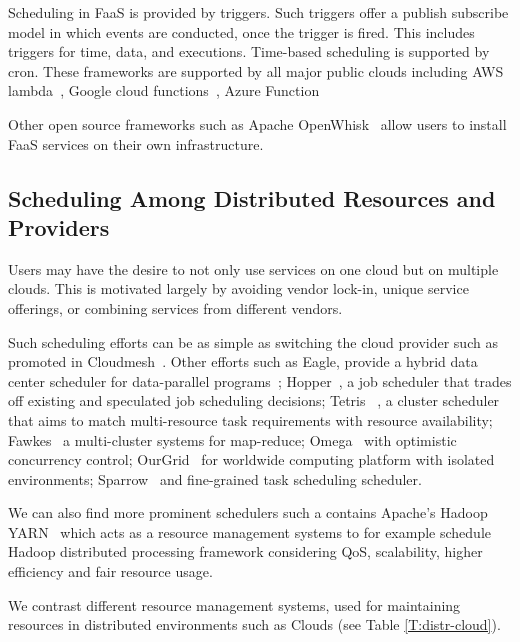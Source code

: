 \documentclass[final,5p,times,twocolumn]{elsarticle}
\begin{document}
Scheduling in FaaS is provided by triggers. Such triggers offer a
publish subscribe model in which events are conducted, once the
trigger is fired. This includes triggers for time, data, and
executions. Time-based scheduling is supported by cron.  These
frameworks are supported by all major public clouds including AWS
lambda~\cite{AWSlambda2018}, Google cloud
functions~\cite{GoogleCF2018}, Azure Function~\cite{Azure2018}

Other open source frameworks such as Apache
OpenWhisk~\cite{OpenWhisk2018} allow users to install FaaS services on
their own infrastructure.


\subsection{Scheduling Among Distributed Resources and Providers}
\label{sec:distributed}


Users may have the desire to not only use services on one cloud but on
multiple clouds. This is motivated largely by avoiding vendor lock-in,
unique service offerings, or combining services from different
vendors.

Such scheduling efforts can be as simple as switching the cloud
provider such as promoted in Cloudmesh~\cite{von2014accessing}.
Other efforts such as Eagle, provide a hybrid data center scheduler for
data-parallel programs~\cite{delgado2016job};
Hopper~\cite{ren2015hopper}, a job scheduler that trades off existing
and speculated job scheduling decisions; Tetris
~\cite{grandl2015multi}, a cluster scheduler that aims to match
multi-resource task requirements with resource availability;
Fawkes~\cite{ghit2014balanced} a multi-cluster systems for map-reduce;
Omega~\cite{schwarzkopf2013omega} with optimistic concurrency control;
OurGrid~\cite{andrade2003ourgrid,cirne2006labs} for worldwide
computing platform with isolated environments;
Sparrow~\cite{ousterhout2013sparrow} and fine-grained task scheduling
scheduler.
  
We can also find more prominent schedulers such a contains Apache's
Hadoop YARN~\cite{vavilapalli2013apache} which acts as a resource
management systems to for example schedule Hadoop distributed
processing framework considering QoS, scalability, higher efficiency
and fair resource usage.

We contrast different resource management systems, used for
maintaining resources in distributed environments such as Clouds (see
Table \ref{T:distr-cloud}).

%
\end{document}
